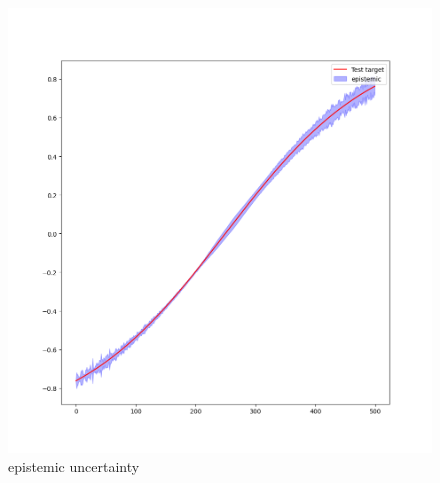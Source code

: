 \documentclass[11pt]{article}
\begin{document}
\begin{figure}[htbp]
\centering
\includegraphics[width=.9\linewidth]{./epistemic.png}
\caption{epistemic uncertainty}
\end{figure}
\end{document}
